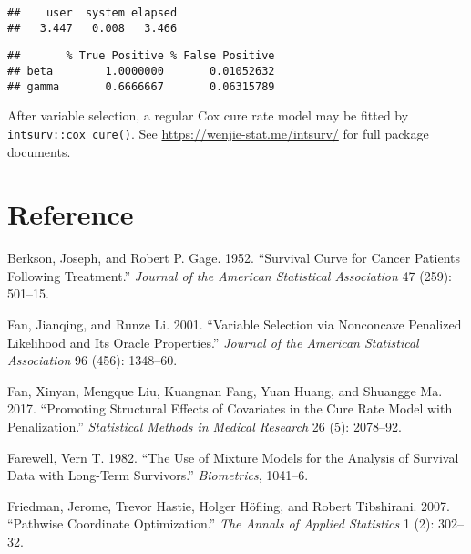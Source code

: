 \begin{verbatim}
##    user  system elapsed 
##   3.447   0.008   3.466
\end{verbatim}

\begin{Shaded}
\begin{Highlighting}[]
\end{Highlighting}
\end{Shaded}

\begin{verbatim}
##       % True Positive % False Positive
## beta        1.0000000       0.01052632
## gamma       0.6666667       0.06315789
\end{verbatim}

After variable selection, a regular Cox cure rate model may be fitted by
\texttt{intsurv::cox\_cure()}. See \url{https://wenjie-stat.me/intsurv/}
for full package documents.

\section*{Reference}
\setlength{\parindent}{0em}
\setlength{\parskip}{0.15em}

\hypertarget{refs}{}
\leavevmode\hypertarget{ref-berkson1952jasa}{}%
Berkson, Joseph, and Robert P. Gage. 1952. ``Survival Curve for Cancer
Patients Following Treatment.'' \emph{Journal of the American
Statistical Association} 47 (259): 501--15.

\leavevmode\hypertarget{ref-fanLi2001jasa}{}%
Fan, Jianqing, and Runze Li. 2001. ``Variable Selection via Nonconcave
Penalized Likelihood and Its Oracle Properties.'' \emph{Journal of the
American Statistical Association} 96 (456): 1348--60.

\leavevmode\hypertarget{ref-fan2017smmr}{}%
Fan, Xinyan, Mengque Liu, Kuangnan Fang, Yuan Huang, and Shuangge Ma.
2017. ``Promoting Structural Effects of Covariates in the Cure Rate
Model with Penalization.'' \emph{Statistical Methods in Medical
Research} 26 (5): 2078--92.

\leavevmode\hypertarget{ref-farewell1982biometrics}{}%
Farewell, Vern T. 1982. ``The Use of Mixture Models for the Analysis of
Survival Data with Long-Term Survivors.'' \emph{Biometrics}, 1041--6.

\leavevmode\hypertarget{ref-friedman2007aoas}{}%
Friedman, Jerome, Trevor Hastie, Holger Höfling, and Robert Tibshirani.
2007. ``Pathwise Coordinate Optimization.'' \emph{The Annals of Applied
Statistics} 1 (2): 302--32.

